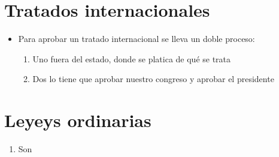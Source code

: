 \section{}

\section{Tratados internacionales}
\begin{itemize}
    \item Para aprobar un tratado internacional se lleva un doble proceso:
        \begin{enumerate}
            \item Uno fuera del estado, donde se platica de qué se trata
            \item Dos lo tiene que aprobar nuestro congreso y aprobar el presidente
        \end{enumerate}
\end{itemize}

\section{Leyeys ordinarias}
\begin{enumerate}
    \item Son 
\end{enumerate}
